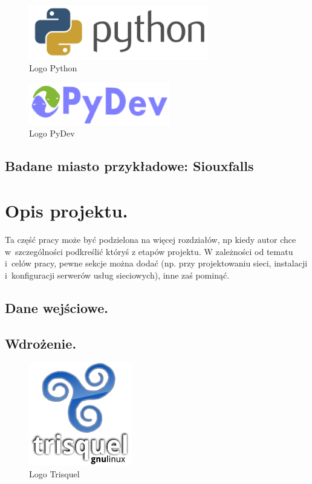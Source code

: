 \documentclass[twoside,12pt]{report}
\let\oldsection\chapter
\def\chapter{\cleardoublepage\oldsection}
\begin{document}
\begin{figure}[ht]
\includegraphics[width=0.7\textwidth]{img/py}
\caption{Logo Python\cite{python}}
\end{figure}
\begin{figure}[ht]
\includegraphics[width=0.55\textwidth]{img/pydev}
\caption{Logo PyDev\cite{pydev}}
\end{figure}

\section{Badane miasto przykładowe: Siouxfalls}


\chapter{Opis projektu.}\label{rozdz.opis} 
Ta część pracy może być podzielona na więcej rozdziałów, np kiedy autor chce
w~szczególności podkreślić któryś z etapów projektu. W zależności od tematu i~celów pracy, pewne sekcje można dodać (np. przy projektowaniu sieci, instalacji
i~konfiguracji serwerów usług sieciowych), inne zaś pominąć.

\section{Dane wejściowe.}





\section{Wdrożenie.}

\begin{figure}[ht]
\includegraphics[width=0.4\textwidth]{img/trisquel}
\caption{Logo Trisquel\cite{trisquel}}
\end{figure}
\end{document}
